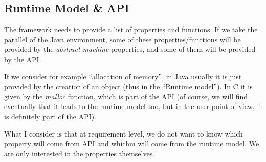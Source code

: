 \documentclass{template/openetcs_article}
\begin{document}

\subsection{Runtime Model \& API}
The framework needs to provide a list of properties and functions. If we take the parallel of the Java environment, some of these properties/functions will be 
provided by the \emph{abstract machine} properties, and some of them will be provided by the API.

If we consider for example ``allocation of memory'', in Java usually it is just provided by the creation of an object (thus in the ``Runtime model''). In C it is given by the 
\emph{malloc} function, which is part of the API (of course, we will find eventually that it leads to the runtime model too, but in the user point of view, it is
definitely part of the API).

What I consider is that at requirement level, we do not want to know which property will come from API and whichm will come from the runtime model. We are only
interested in the properties themselves.
\end{document}
